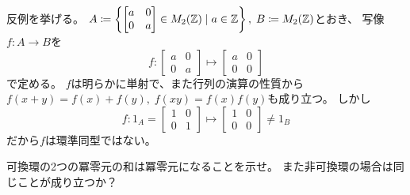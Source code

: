 \documentclass[report]{jlreq}
\begin{document}
\begin{answer}
    反例を挙げる。
    $A \coloneqq \left\{
        \begin{bmatrix}
            a & 0 \\
            0 & a
        \end{bmatrix} \in M_2(\mathbb{Z})
        \mid
        a \in \mathbb{Z}
    \right\}, \; B \coloneqq M_2(\mathbb{Z})$とおき、
    写像$f \colon A \to B$を
    \begin{equation}
        f \colon \begin{bmatrix}
            a & 0 \\
            0 & a
        \end{bmatrix}
            \mapsto
            \begin{bmatrix}
                a & 0 \\
                0 & 0
            \end{bmatrix}
    \end{equation}
    で定める。
    $f$は明らかに単射で、また行列の演算の性質から
    $f(x + y) = f(x) + f(y), \; f(xy) = f(x) f(y)$も成り立つ。
    しかし
    \begin{equation}
        f \colon 1_A = \begin{bmatrix}
            1 & 0 \\
            0 & 1
        \end{bmatrix}
            \mapsto
            \begin{bmatrix}
                1 & 0 \\
                0 & 0
            \end{bmatrix}
            \neq 1_B
    \end{equation}
    だから$f$は環準同型ではない。
\end{answer}

\begin{problem}[代数学II 1.4]
    可換環の2つの冪零元の和は冪零元になることを示せ。
    また非可換環の場合は同じことが成り立つか？
\end{problem}
\end{document}
